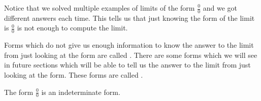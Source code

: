 \documentclass{ximera}
\begin{document}
Notice that we solved multiple examples of limits of the form
$\frac{0}{0}$ and we got different answers each time.  This tells us
that just knowing the form of the limit is $\frac{0}{0}$ is not enough
to compute the limit.

\begin{definition}
Forms which do not give us enough information to know the answer to
the limit from just looking at the form are called .  There are some forms which we will see in future sections
which will be able to tell us the answer to the limit from just
looking at the form. These forms are called .
\end{definition}  

The form $\frac{0}{0}$ is an indeterminate form.
\end{document}
